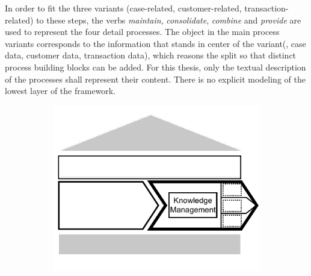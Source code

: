 In order to fit the three variants (case-related, customer-related, transaction-related) to these steps, the verbs \textit{maintain}, \textit{consolidate}, \textit{combine} and \textit{provide} are used to represent the four detail processes. The object in the main process variants corresponds to the information that stands in center of the variant(\eg, case data, customer data, transaction data), which reasons the split so that distinct process building blocks can be added. 
For this thesis, only the textual description of the processes shall represent their content. There is no explicit modeling of the lowest layer of the framework. 

\begin{figure}[caption={\textsc{Knowledge Management} Main Process Variants}, label={fig:knowledge}]
	\begin{subfigure}[b]{.6\textwidth}
		\begin{center}
			\includegraphics{figures/processes/knowledgemanagement.pdf}
		\end{center}
	\end{subfigure}

	\begin{subfigure}[b]{.32\textwidth}
		\begin{center}
\end{center}
\end{subfigure}
\end{figure}
